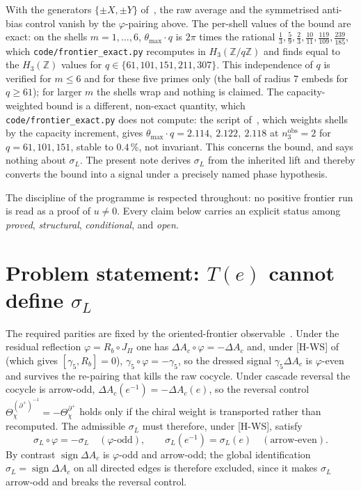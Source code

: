 \documentclass[11pt]{article}
\theoremstyle{plain}
\theoremstyle{remark}
\newcommand{\dac}{\Delta A_c}
\newcommand{\thmax}{\theta_{\max}}
\newcommand{\JPi}{J_\Pi}
\newcommand{\sgn}{\operatorname{sign}}
\begin{document}
    With the generators $\{\pm X,\pm Y\}$ of~\cite{Beau2026a16}, the raw average and the symmetrised anti-bias control
    vanish by the $\varphi$-pairing above.
    The per-shell values of the bound are exact: on the shells $m=1,\dots,6$, $\thmax\cdot q$ is $2\pi$ times the rational
    $\tfrac13,\tfrac59,\tfrac23,\tfrac{10}{11},\tfrac{119}{109},\tfrac{239}{185}$, which
    \texttt{code/frontier\_exact.py} recomputes in $H_3(\mathbb{Z}/q\mathbb{Z})$ and finds equal to the $H_3(\mathbb{Z})$
    values for $q\in\{61,101,151,211,307\}$.
    This independence of $q$ is verified for $m\le 6$ and for these five primes only (the ball of radius $7$ embeds for
    $q\ge 61$); for larger $m$ the shells wrap and nothing is claimed.
    The capacity-weighted bound is a different, non-exact quantity, which \texttt{code/frontier\_exact.py} does not compute:
    the script of~\cite{Beau2026q11of}, which weights shells by the capacity increment, gives
    $\thmax\cdot q=2.114,\ 2.122,\ 2.118$ at $n_3^{\mathrm{obs}}=2$ for $q=61,101,151$, stable to $0.4\,\%$, not
    invariant.
    This concerns the bound, and says nothing about $\sigma_L$.
    The present note derives $\sigma_L$ from the inherited lift and thereby converts the bound into a signal under a
    precisely named phase hypothesis.

    The discipline of the programme is respected throughout: no positive frontier run is read as a proof of $u\neq 0$.
    Every claim below carries an explicit status among \emph{proved}, \emph{structural}, \emph{conditional}, and
    \emph{open}.

  \section{Problem statement: $T(e)$ cannot define $\sigma_L$}

    The required parities are fixed by the oriented-frontier observable~\cite{Beau2026q11of}.
    Under the residual reflection $\varphi = R_b\circ\JPi$ one has $\dac\circ\varphi = -\dac$ and, under [H-WS]
    of~\cite{Beau2026q11of} (which gives $[\gamma_5,R_b]=0$), $\gamma_5\circ\varphi = -\gamma_5$, so the dressed signal $\gamma_5\dac$ is $\varphi$-even and survives the re-pairing that kills the raw
    cocycle.
    Under cascade reversal the cocycle is arrow-odd, $\dac(e^{-1}) = -\dac(e)$, so the reversal control
    $\Theta_\chi^{(\partial^+)^{-1}} = -\Theta_\chi^{\partial^+}$ holds only if the chiral weight is transported rather than
    recomputed.
    The admissible $\sigma_L$ must therefore, under [H-WS], satisfy
    \begin{equation}
      \sigma_L\circ\varphi = -\sigma_L \quad(\varphi\text{-odd}),
      \qquad
      \sigma_L(e^{-1}) = \sigma_L(e) \quad(\text{arrow-even}).
    \end{equation}
    By contrast $\sgn\dac$ is $\varphi$-odd and arrow-odd; the global identification $\sigma_L = \sgn\dac$ on all directed
    edges is therefore excluded, since it makes $\sigma_L$ arrow-odd and breaks the reversal control.
\end{document}
